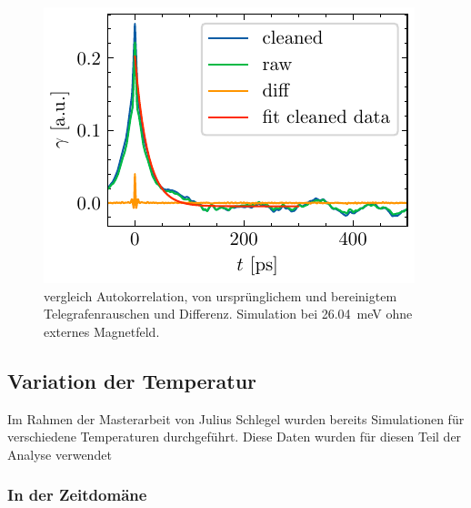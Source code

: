 \documentclass[main.tex]{subfiles}
\begin{document}
\begin{figure}[H]
    \centering
    \includegraphics{bilder/plots/Bz_0mT/autocorr_26.03meV.pdf}
    \caption{vergleich Autokorrelation, von ursprünglichem und bereinigtem Telegrafenrauschen und Differenz. Simulation bei \SI{26.04}{\milli\electronvolt} ohne externes Magnetfeld.}\label{fig:autocorr}
\end{figure}

\subsection{Variation der Temperatur}

Im Rahmen der Masterarbeit von Julius Schlegel \cite{schlegel-master} wurden bereits Simulationen für verschiedene Temperaturen durchgeführt. Diese Daten wurden für diesen Teil der Analyse verwendet

\subsubsection{In der Zeitdomäne}
\end{document}
